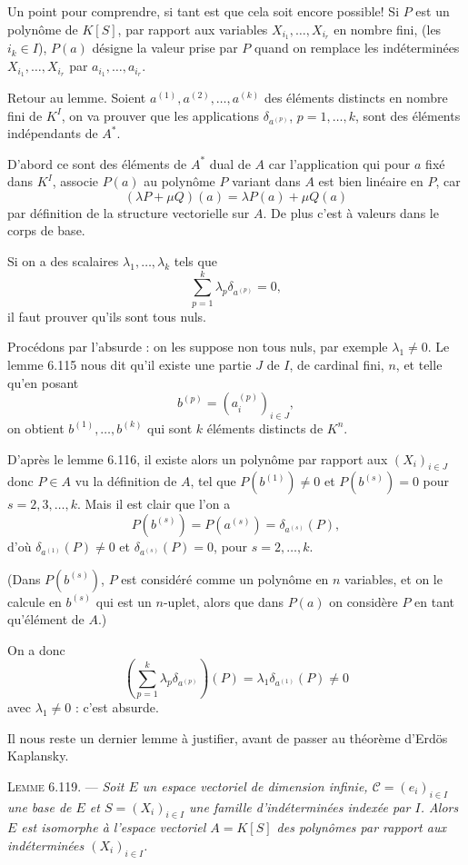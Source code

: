 Un point pour comprendre, si tant est que cela soit encore possible! Si $P$ est un polynôme de $K[S]$, par rapport aux variables $X_{i_1},\ldots,X_{i_r}$ en nombre fini, (les $i_k\in I$), $P(a)$ désigne la valeur prise par $P$ quand on remplace les indéterminées $X_{i_1},\ldots,X_{i_r}$ par $a_{i_1},\ldots,a_{i_r}$.

Retour au lemme. Soient $a^{(1)},a^{(2)},\ldots,a^{(k)}$ des éléments distincts en nombre fini de $K^I$, on va prouver que les applications $\delta_{a^{(p)}}$, $p=1,\ldots,k$, sont des éléments indépendants de $A^*$.

D'abord ce sont des éléments de $A^*$ dual de $A$ car l'application qui pour $a$ fixé dans $K^I$, associe $P(a)$ au polynôme $P$ variant dans $A$ est bien linéaire en $P$, car
\[
(\lambda P+\mu Q)(a)=\lambda P(a)+\mu Q(a)
\]
par définition de la structure vectorielle sur $A$. De plus c'est à valeurs dans le corps de base.

Si on a des scalaires $\lambda_1,\ldots,\lambda_k$ tels que
\[
\sum_{p=1}^k\lambda_p\delta_{a^{(p)}}=0,
\]
il faut prouver qu'ils sont tous nuls.

Procédons par l'absurde : on les suppose non tous nuls, par exemple $\lambda_1\ne0$. Le lemme 6.115 nous dit qu'il existe une partie $J$ de $I$, de cardinal fini, $n$, et telle qu'en posant
\[
b^{(p)}=(a_i^{(p)})_{i\in J},
\]
on obtient $b^{(1)},\ldots,b^{(k)}$ qui sont $k$ éléments distincts de $K^n$.

D'après le lemme 6.116, il existe alors un polynôme par rapport aux $(X_i)_{i\in J}$ donc $P\in A$ vu la définition de $A$, tel que $P(b^{(1)})\ne0$ et $P(b^{(s)})=0$ pour $s=2,3,\ldots,k$. Mais il est clair que l'on a
\[
P(b^{(s)})=P(a^{(s)})=\delta_{a^{(s)}}(P),
\]
d'où $\delta_{a^{(1)}}(P)\ne0$ et $\delta_{a^{(s)}}(P)=0$, pour $s=2,\ldots,k$.

(Dans $P(b^{(s)})$, $P$ est considéré comme un polynôme en $n$ variables, et on le calcule en $b^{(s)}$ qui est un $n$-uplet, alors que dans $P(a)$ on considère $P$ en tant qu'élément de $A$.)

On a donc
\[
\left(\sum_{p=1}^k\lambda_p\delta_{a^{(p)}}\right)(P)=\lambda_1\delta_{a^{(1)}}(P)\ne0
\]
avec $\lambda_1\ne0$ : c'est absurde. \bookend

Il nous reste un dernier lemme à justifier, avant de passer au théorème d'Erdös Kaplansky.

\medskip\noindent\textsc{Lemme 6.119.} --- \emph{Soit $E$ un espace vectoriel de dimension infinie, $\mathcal C=(e_i)_{i\in I}$ une base de $E$ et $S=(X_i)_{i\in I}$ une famille d'indéterminées indexée par $I$. Alors $E$ est isomorphe à l'espace vectoriel $A=K[S]$ des polynômes par rapport aux indéterminées $(X_i)_{i\in I}$.}


